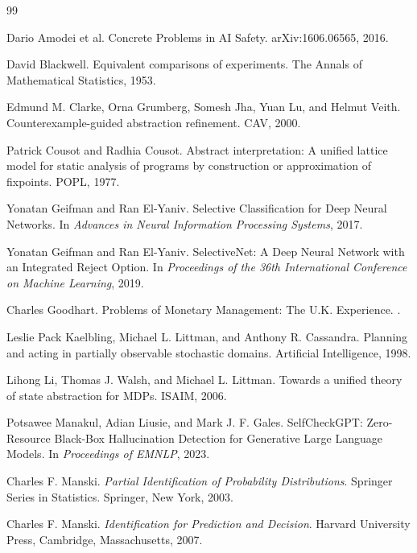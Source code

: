 \documentclass[11pt]{article}
\begin{document}
\begin{thebibliography}{99}

Dario Amodei et al.
\newblock Concrete Problems in AI Safety.
\newblock arXiv:1606.06565, 2016.

David Blackwell.
\newblock Equivalent comparisons of experiments.
\newblock The Annals of Mathematical Statistics, 1953.

Edmund M. Clarke, Orna Grumberg, Somesh Jha, Yuan Lu, and Helmut Veith.
\newblock Counterexample-guided abstraction refinement.
\newblock CAV, 2000.

Patrick Cousot and Radhia Cousot.
\newblock Abstract interpretation: A unified lattice model for static analysis of programs by construction or approximation of fixpoints.
\newblock POPL, 1977.

Yonatan Geifman and Ran El-Yaniv.
\newblock Selective Classification for Deep Neural Networks.
\newblock In \emph{Advances in Neural Information Processing Systems}, 2017.

Yonatan Geifman and Ran El-Yaniv.
\newblock SelectiveNet: A Deep Neural Network with an Integrated Reject Option.
\newblock In \emph{Proceedings of the 36th International Conference on Machine Learning}, 2019.

Charles Goodhart.
\newblock Problems of Monetary Management: The U.K. Experience.
.

Leslie Pack Kaelbling, Michael L. Littman, and Anthony R. Cassandra.
\newblock Planning and acting in partially observable stochastic domains.
\newblock Artificial Intelligence, 1998.

Lihong Li, Thomas J. Walsh, and Michael L. Littman.
\newblock Towards a unified theory of state abstraction for MDPs.
\newblock ISAIM, 2006.

Potsawee Manakul, Adian Liusie, and Mark J. F. Gales.
\newblock SelfCheckGPT: Zero-Resource Black-Box Hallucination Detection for Generative Large Language Models.
\newblock In \emph{Proceedings of EMNLP}, 2023.

Charles F. Manski.
\newblock \emph{Partial Identification of Probability Distributions}.
\newblock Springer Series in Statistics. Springer, New York, 2003.

Charles F. Manski.
\newblock \emph{Identification for Prediction and Decision}.
\newblock Harvard University Press, Cambridge, Massachusetts, 2007.


\end{thebibliography}
\end{document}
